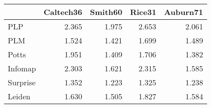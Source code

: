 \begin{tabular}{lrrrr}
\toprule
{} & Caltech36 & Smith60 & Rice31 & Auburn71 \\
\midrule
PLP      &     2.365 &   1.975 &  2.653 &    2.061 \\
PLM      &     1.524 &   1.421 &  1.699 &    1.489 \\
Potts    &     1.951 &   1.409 &  1.706 &    1.382 \\
Infomap  &     2.303 &   1.621 &  2.315 &    1.585 \\
Surprise &     1.352 &   1.223 &  1.325 &    1.238 \\
Leiden   &     1.630 &   1.505 &  1.827 &    1.584 \\
\bottomrule
\end{tabular}
